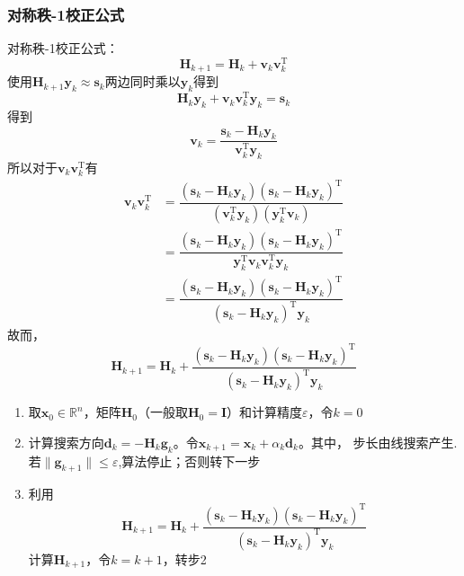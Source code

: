\subsubsection{对称秩-1校正公式}
\begin{note}
    对称秩-1校正公式：
    \[
        \boldsymbol{H}_{k+1} = \boldsymbol{H}_{k} + \boldsymbol{v}_k\boldsymbol{v}_{k}^{\mathrm{T}}
    \]
    使用$\boldsymbol{H}_{k+1}\boldsymbol{y}_{k}\approx \boldsymbol{s}_{k}$两边同时乘以$\boldsymbol{y}_{k}$得到
    \[
        \boldsymbol{H}_{k}\boldsymbol{y}_{k} + \boldsymbol{v}_k\boldsymbol{v}_{k}^{\mathrm{T}}\boldsymbol{y}_{k} = \boldsymbol{s}_{k}
    \]
    得到
    \[
        \boldsymbol{v}_k = \dfrac{\boldsymbol{s}_{k}-\boldsymbol{H}_{k}\boldsymbol{y}_{k}}{\boldsymbol{v}_{k}^{\mathrm{T}}\boldsymbol{y}_{k}}
    \]
    所以对于$\boldsymbol{v}_k\boldsymbol{v}_{k}^{\mathrm{T}}$有
    \[
        \begin{array}{ll}
            \boldsymbol{v}_k\boldsymbol{v}_{k}^{\mathrm{T}} &= \dfrac{(\boldsymbol{s}_{k}-\boldsymbol{H}_{k}\boldsymbol{y}_{k})(\boldsymbol{s}_{k}-\boldsymbol{H}_{k}\boldsymbol{y}_{k})^\mathrm{T}}{(\boldsymbol{v}_{k}^{\mathrm{T}}\boldsymbol{y}_{k})(\boldsymbol{y}_{k}^{\mathrm{T}}\boldsymbol{v}_{k})}\\
            &=\dfrac{(\boldsymbol{s}_{k}-\boldsymbol{H}_{k}\boldsymbol{y}_{k})(\boldsymbol{s}_{k}-\boldsymbol{H}_{k}\boldsymbol{y}_{k})^\mathrm{T}}{\boldsymbol{y}_{k}^{\mathrm{T}}\boldsymbol{v}_{k}\boldsymbol{v}_{k}^{\mathrm{T}}\boldsymbol{y}_{k}}\\
            &=\dfrac{(\boldsymbol{s}_{k}-\boldsymbol{H}_{k}\boldsymbol{y}_{k})(\boldsymbol{s}_{k}-\boldsymbol{H}_{k}\boldsymbol{y}_{k})^\mathrm{T}}{(\boldsymbol{s}_{k}-\boldsymbol{H}_{k}\boldsymbol{y}_{k})^\mathrm{T}\boldsymbol{y}_{k}}
        \end{array}
    \]
    故而，
    \begin{equation}\label{eq:Rank-1_Hk+1}
        \boldsymbol{H}_{k+1} = \boldsymbol{H}_{k} + \dfrac{(\boldsymbol{s}_{k}-\boldsymbol{H}_{k}\boldsymbol{y}_{k})(\boldsymbol{s}_{k}-\boldsymbol{H}_{k}\boldsymbol{y}_{k})^\mathrm{T}}{(\boldsymbol{s}_{k}-\boldsymbol{H}_{k}\boldsymbol{y}_{k})^\mathrm{T}\boldsymbol{y}_{k}}
    \end{equation}
    \begin{enumerate}
        \item 取$\boldsymbol{x}_{0}\in\mathbb{R}^{n}$，矩阵$\boldsymbol{H}_{0}$（一般取$\boldsymbol{H}_{0} = \boldsymbol{I}$）和计算精度$\varepsilon$，令$k = 0$
        \item 计算搜索方向$\boldsymbol{d}_{k} = -\boldsymbol{H}_{k}\boldsymbol{g}_k$。令$\boldsymbol{x}_{k+1} = \boldsymbol{x}_{k}+\alpha_k\boldsymbol{d}_k$。其中， 步长由线搜索产生. 若$\|\boldsymbol{g}_{k+1}\|\leqslant \varepsilon$,算法停止；否则转下一步
        \item 利用
        \[
            \boldsymbol{H}_{k+1} = \boldsymbol{H}_{k} + \dfrac{(\boldsymbol{s}_{k}-\boldsymbol{H}_{k}\boldsymbol{y}_{k})(\boldsymbol{s}_{k}-\boldsymbol{H}_{k}\boldsymbol{y}_{k})^\mathrm{T}}{(\boldsymbol{s}_{k}-\boldsymbol{H}_{k}\boldsymbol{y}_{k})^\mathrm{T}\boldsymbol{y}_{k}}
        \]
        计算$\boldsymbol{H}_{k+1}$，令$k = k+1$，转步2
    \end{enumerate}
\end{note}
